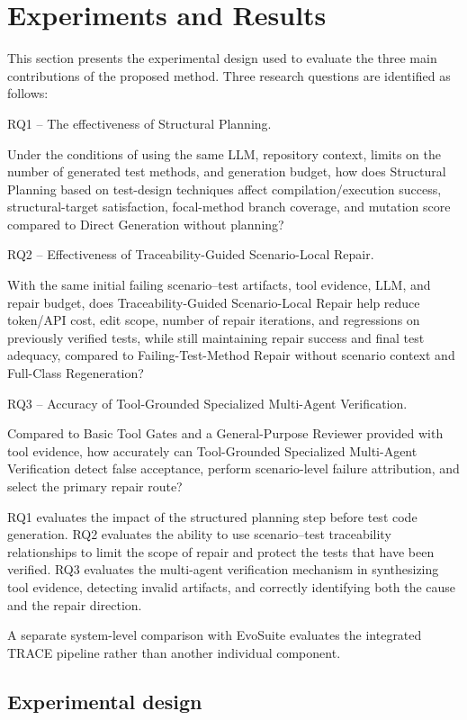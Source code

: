 \documentclass[pdflatex,sn-basic,Numbered,iicol]{sn-jnl}
\begin{document}
\section{Experiments and Results}\label{sec:experiments}

This section presents the experimental design used to evaluate the three main contributions of the proposed method. Three research questions are identified as follows:

RQ1 -- The effectiveness of Structural Planning.

Under the conditions of using the same LLM, repository context, limits on the number of generated test methods, and generation budget, how does Structural Planning based on test-design techniques affect compilation/execution success, structural-target satisfaction, focal-method branch coverage, and mutation score compared to Direct Generation without planning?

RQ2 -- Effectiveness of Traceability-Guided Scenario-Local Repair.

With the same initial failing scenario--test artifacts, tool evidence, LLM, and repair budget, does Traceability-Guided Scenario-Local Repair help reduce token/API cost, edit scope, number of repair iterations, and regressions on previously verified tests, while still maintaining repair success and final test adequacy, compared to Failing-Test-Method Repair without scenario context and Full-Class Regeneration?

RQ3 -- Accuracy of Tool-Grounded Specialized Multi-Agent Verification.

Compared to Basic Tool Gates and a General-Purpose Reviewer provided with tool evidence, how accurately can Tool-Grounded Specialized Multi-Agent Verification detect false acceptance, perform scenario-level failure attribution, and select the primary repair route?

RQ1 evaluates the impact of the structured planning step before test code generation. RQ2 evaluates the ability to use scenario--test traceability relationships to limit the scope of repair and protect the tests that have been verified. RQ3 evaluates the multi-agent verification mechanism in synthesizing tool evidence, detecting invalid artifacts, and correctly identifying both the cause and the repair direction.

A separate system-level comparison with EvoSuite evaluates the integrated TRACE pipeline rather than another individual component.

\subsection{Experimental design}\label{subsec:experimental-design}
\end{document}
